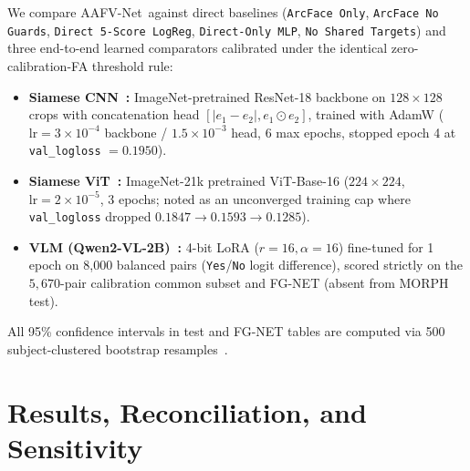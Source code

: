 \documentclass[journal]{IEEEtran}
\newcommand{\sys}{AAFV-Net}
\begin{document}
We compare \sys\ against direct baselines (\texttt{ArcFace Only}, \texttt{ArcFace No Guards}, \texttt{Direct 5-Score LogReg}, \texttt{Direct-Only MLP}, \texttt{No Shared Targets}) and three end-to-end learned comparators calibrated under the identical zero-calibration-FA threshold rule:
\begin{itemize}
    \item \textbf{Siamese CNN~\cite{chopra2005siamese}:} ImageNet-pretrained ResNet-18 backbone on $128\times 128$ crops with concatenation head $[|e_1-e_2|, e_1 \odot e_2]$, trained with AdamW ($\text{lr}=3\times 10^{-4}$ backbone / $1.5\times 10^{-3}$ head, 6 max epochs, stopped epoch 4 at \texttt{val\_logloss} $=0.1950$).
    \item \textbf{Siamese ViT~\cite{dosovitskiy2021vit}:} ImageNet-21k pretrained ViT-Base-16 ($224\times 224$, $\text{lr}=2\times 10^{-5}$, 3 epochs; noted as an unconverged training cap where \texttt{val\_logloss} dropped $0.1847 \!\to\! 0.1593 \!\to\! 0.1285$).
    \item \textbf{VLM (Qwen2-VL-2B)~\cite{wang2024qwen2vl,hu2022lora}:} 4-bit LoRA ($r=16, \alpha=16$) fine-tuned for 1 epoch on 8,000 balanced pairs (\texttt{Yes}/\texttt{No} logit difference), scored strictly on the $5{,}670$-pair calibration common subset and FG-NET (absent from MORPH test).
\end{itemize}
All 95\% confidence intervals in test and FG-NET tables are computed via 500 subject-clustered bootstrap resamples~\cite{bolle2004subsets,schuckers2010book}.

\section{Results, Reconciliation, and Sensitivity}
\label{sec:results}


\end{document}
